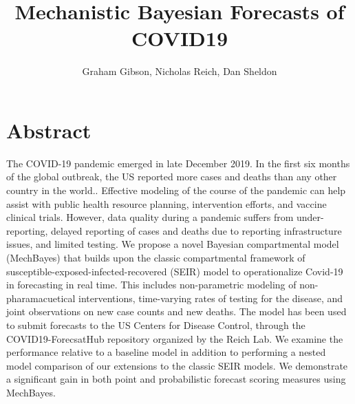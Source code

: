\documentclass[11pt]{amsart}
\title{Mechanistic Bayesian Forecasts of COVID19}
\author{Graham Gibson, Nicholas Reich, Dan Sheldon}
\begin{document}
\maketitle

\section*{Abstract}

The COVID-19 pandemic emerged in late December 2019. In the first six months of the global outbreak, the US reported more cases and deaths than any other country in the world.. Effective modeling of the course of the pandemic can help assist with public health resource planning, intervention efforts, and vaccine clinical trials. However, data quality during a pandemic suffers from under-reporting, delayed reporting of cases and deaths due to reporting infrastructure issues, and limited testing. We propose a novel Bayesian compartmental model (MechBayes) that builds upon the classic compartmental framework of susceptible-exposed-infected-recovered (SEIR) model to operationalize Covid-19 in forecasting in real time. This includes non-parametric modeling of non-pharamacuetical interventions, time-varying rates of testing for the disease, and joint observations on new case counts and new deaths. The model has been used to submit forecasts to the US Centers for Disease Control, through the COVID19-ForecsatHub repository organized by the Reich Lab. We examine the performance relative to a baseline model in addition to performing a nested model comparison of our extensions to the classic SEIR models. We demonstrate a significant gain in both point and probabilistic forecast scoring measures using MechBayes.
\end{document}
